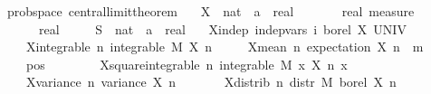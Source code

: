 {\isamarkupfalse%
\ {\isacharparenleft}\ prob{\isacharunderscore}space{\isacharparenright}\ central{\isacharunderscore}limit{\isacharunderscore}theorem{\isacharcolon}\isanewline
\ \ \ X\ {\isacharcolon}{\isacharcolon}\ {\isachardoublequoteopen}nat\ {\isasymRightarrow}\ {\isacharprime}a\ {\isasymRightarrow}\ real{\isachardoublequoteclose}\isanewline
\ \ \ \ \ {\isasymmu}\ {\isacharcolon}{\isacharcolon}\ {\isachardoublequoteopen}real\ measure{\isachardoublequoteclose}\isanewline
\ \ \ \ \ {\isasymsigma}\ {\isacharcolon}{\isacharcolon}\ real\isanewline
\ \ \ \ \ S\ {\isacharcolon}{\isacharcolon}\ {\isachardoublequoteopen}nat\ {\isasymRightarrow}\ {\isacharprime}a\ {\isasymRightarrow}\ real{\isachardoublequoteclose}\isanewline
\ \ \ X{\isacharunderscore}indep{\isacharcolon}\ {\isachardoublequoteopen}indep{\isacharunderscore}vars\ {\isacharparenleft}{\isasymlambda}i{\isachardot}\ borel{\isacharparenright}\ X\ UNIV{\isachardoublequoteclose}\isanewline
\ \ \ \ \ X{\isacharunderscore}integrable{\isacharcolon}\ {\isachardoublequoteopen}{\isasymAnd}n{\isachardot}\ integrable\ M\ {\isacharparenleft}X\ n{\isacharparenright}{\isachardoublequoteclose}\isanewline
\ \ \ \ \ X{\isacharunderscore}mean{\isacharcolon}\ {\isachardoublequoteopen}{\isasymAnd}n{\isachardot}\ expectation\ {\isacharparenleft}X\ n{\isacharparenright}\ {\isacharequal}\ m{\isachardoublequoteclose}\isanewline
\ \ \ \ \ {\isasymsigma}{\isacharunderscore}pos{\isacharcolon}\ {\isachardoublequoteopen}{\isasymsigma}\ {\isachargreater}\ {}{\isachardoublequoteclose}\isanewline
\ \ \ \ \ X{\isacharunderscore}square{\isacharunderscore}integrable{\isacharcolon}\ {\isachardoublequoteopen}{\isasymAnd}n{\isachardot}\ integrable\ M\ {\isacharparenleft}{\isasymlambda}x{\isachardot}\ {\isacharparenleft}X\ n\ x{\isacharparenright}\isanewline
\ \ \ \ \ X{\isacharunderscore}variance{\isacharcolon}\ {\isachardoublequoteopen}{\isasymAnd}n{\isachardot}\ variance\ {\isacharparenleft}X\ n{\isacharparenright}\ {\isacharequal}\ {\isasymsigma}\isanewline
\ \ \ \ \ X{\isacharunderscore}distrib{\isacharcolon}\ {\isachardoublequoteopen}{\isasymAnd}n{\isachardot}\ distr\ M\ borel\ {\isacharparenleft}X\ n{\isacharparenright}\ {\isacharequal}\ {\isasymmu}{\isachardoublequoteclose}\isanewline
}
